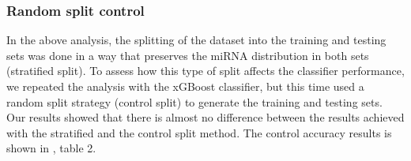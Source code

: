\documentclass{bmcart}
\begin{document}



\subsubsection*{Random split control}
In the above analysis, the splitting of the dataset into the training and testing sets was done in a way that preserves the miRNA distribution in both sets (stratified split). To assess how this type of split affects the classifier performance, we repeated the analysis with the xGBoost classifier, but this time used a random split strategy (control split) to generate the training and testing sets. Our results showed that there is almost no difference between the results achieved with the stratified and the control split method. The control accuracy results is shown in , table 2.


\end{document}
